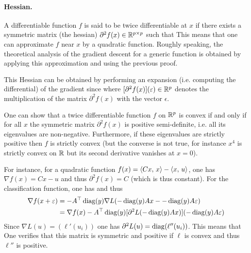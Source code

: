 \paragraph{Hessian.}

A differentiable function $f$ is said to be twice differentiable at $x$ if there exists a symmetric matrix (the hessian) $\partial^2 f(x) \in \mathbb{R}^{p \times p}$ such that 
This means that one can approximate $f$ near $x$ by a quadratic function. Roughly speaking, the theoretical analysis of the gradient descent for a generic function is obtained by applying this approximation and using the previous proof.

This Hessian can be obtained by performing an expansion (i.e. computing the differential) of the gradient since
where $[\partial^2 f(x)](\varepsilon) \in \mathbb{R}^p$ denotes the multiplication of the matrix $\partial^2 f(x)$ with the vector $\epsilon$. 

One can show that a twice differentiable function $f$ on $\mathbb{R}^p$ is convex if and only if for all $x$ the symmetric matrix $\partial^2 f(x)$ is positive semi-definite, i.e. all its eigenvalues are non-negative. 
% 
Furthermore, if these eigenvalues are strictly positive then $f$ is strictly convex (but the converse is not true, for instance $x^4$ is strictly convex on $\mathbb{R}$ but its second derivative vanishes at $x=0$). 

For instance, for a quadratic function $f(x)=\langle C x,\,x\rangle - \langle x,\,u\rangle$, one has $\nabla f(x) = Cx-u$ and thus $\partial^2 f(x) = C$ (which is thus constant).
%
For the classification function, one has 
and thus
\begin{align*}
	\nabla f(x+\varepsilon) &= -A^\top \operatorname{diag}(y) \nabla L( -\operatorname{diag}(y) Ax - -\operatorname{diag}(y) A\varepsilon)  \\
		&= \nabla f(x)  -A^\top \operatorname{diag}(y) [\partial^2 L( -\operatorname{diag}(y) Ax)]( -\operatorname{diag}(y) A\varepsilon) 
\end{align*}
Since $\nabla L(u) = (\ell'(u_i))$ one has $\partial^2 L(u)=\operatorname{diag}(\ell''(u_i))$. This means that 
One verifies that this matrix is symmetric and positive if $\ell$ is convex and thus $\ell''$ is positive. 



